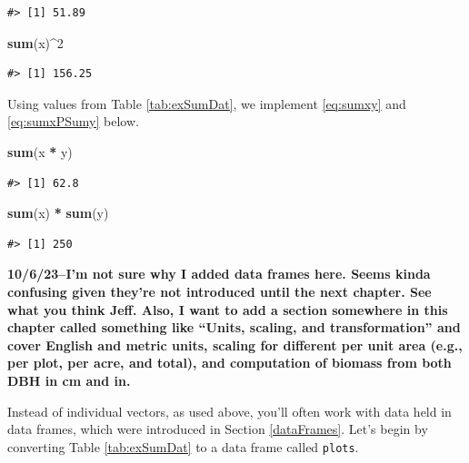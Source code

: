 \documentclass[
  11pt,
]{krantz}
\newenvironment{Shaded}{\begin{snugshade}}{\end{snugshade}}
\newcommand{\DecValTok}[1]{\textcolor[rgb]{0.00,0.00,0.81}{#1}}
\newcommand{\KeywordTok}[1]{\textcolor[rgb]{0.13,0.29,0.53}{\textbf{#1}}}
\newcommand{\NormalTok}[1]{#1}
\newcommand{\OperatorTok}[1]{\textcolor[rgb]{0.81,0.36,0.00}{\textbf{#1}}}
\newcommand{\StringTok}[1]{\textcolor[rgb]{0.31,0.60,0.02}{#1}}
\theoremstyle{definition}
\theoremstyle{definition}
\theoremstyle{definition}
\theoremstyle{definition}
\theoremstyle{remark}
\begin{document}
\begin{verbatim}
#> [1] 51.89
\end{verbatim}

\begin{Shaded}
\begin{Highlighting}[]
\KeywordTok{sum}\NormalTok{(x)}\OperatorTok{\^{}}\DecValTok{2}
\end{Highlighting}
\end{Shaded}

\begin{verbatim}
#> [1] 156.25
\end{verbatim}

Using values from Table \ref{tab:exSumDat}, we implement \eqref{eq:sumxy} and \eqref{eq:sumxPSumy} below.

\begin{Shaded}
\begin{Highlighting}[]
\KeywordTok{sum}\NormalTok{(x }\OperatorTok{*}\StringTok{ }\NormalTok{y)}
\end{Highlighting}
\end{Shaded}

\begin{verbatim}
#> [1] 62.8
\end{verbatim}

\begin{Shaded}
\begin{Highlighting}[]
\KeywordTok{sum}\NormalTok{(x) }\OperatorTok{*}\StringTok{ }\KeywordTok{sum}\NormalTok{(y)}
\end{Highlighting}
\end{Shaded}

\begin{verbatim}
#> [1] 250
\end{verbatim}

\textbf{10/6/23--I'm not sure why I added data frames here. Seems kinda confusing given they're not introduced until the next chapter. See what you think Jeff. Also, I want to add a section somewhere in this chapter called something like ``Units, scaling, and transformation'' and cover English and metric units, scaling for different per unit area (e.g., per plot, per acre, and total), and computation of biomass from both DBH in cm and in.}

Instead of individual vectors, as used above, you'll often work with data held in data frames, which were introduced in Section \ref{dataFrames}. Let's begin by converting Table \ref{tab:exSumDat} to a data frame called \texttt{plots}.
\end{document}
